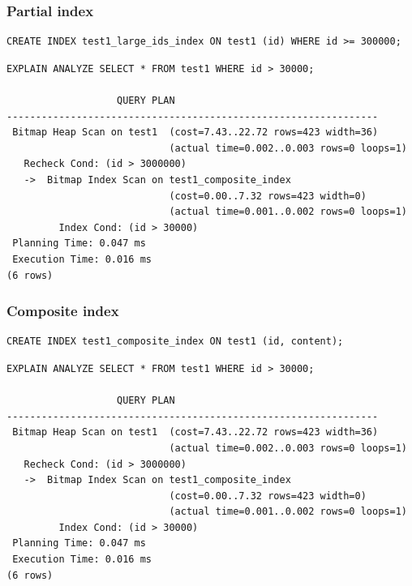 \documentclass{beamer}
\begin{document}
\begin{frame}[fragile]
    \frametitle{Partial index}
    \begin{verbatim}
CREATE INDEX test1_large_ids_index ON test1 (id) WHERE id >= 300000;
    \end{verbatim}
    \vspace{-25pt}
    \begin{verbatim}
EXPLAIN ANALYZE SELECT * FROM test1 WHERE id > 30000;

                   QUERY PLAN
----------------------------------------------------------------
 Bitmap Heap Scan on test1  (cost=7.43..22.72 rows=423 width=36)
                            (actual time=0.002..0.003 rows=0 loops=1)
   Recheck Cond: (id > 3000000)
   ->  Bitmap Index Scan on test1_composite_index
                            (cost=0.00..7.32 rows=423 width=0)
                            (actual time=0.001..0.002 rows=0 loops=1)
         Index Cond: (id > 30000)
 Planning Time: 0.047 ms
 Execution Time: 0.016 ms
(6 rows)
    \end{verbatim}
\end{frame}

\begin{frame}[fragile]
    \frametitle{Composite index}
    \begin{verbatim}
CREATE INDEX test1_composite_index ON test1 (id, content);
    \end{verbatim}

    \begin{verbatim}
EXPLAIN ANALYZE SELECT * FROM test1 WHERE id > 30000;

                   QUERY PLAN
----------------------------------------------------------------
 Bitmap Heap Scan on test1  (cost=7.43..22.72 rows=423 width=36)
                            (actual time=0.002..0.003 rows=0 loops=1)
   Recheck Cond: (id > 3000000)
   ->  Bitmap Index Scan on test1_composite_index
                            (cost=0.00..7.32 rows=423 width=0)
                            (actual time=0.001..0.002 rows=0 loops=1)
         Index Cond: (id > 30000)
 Planning Time: 0.047 ms
 Execution Time: 0.016 ms
(6 rows)
    \end{verbatim}
\end{frame}
\end{document}
